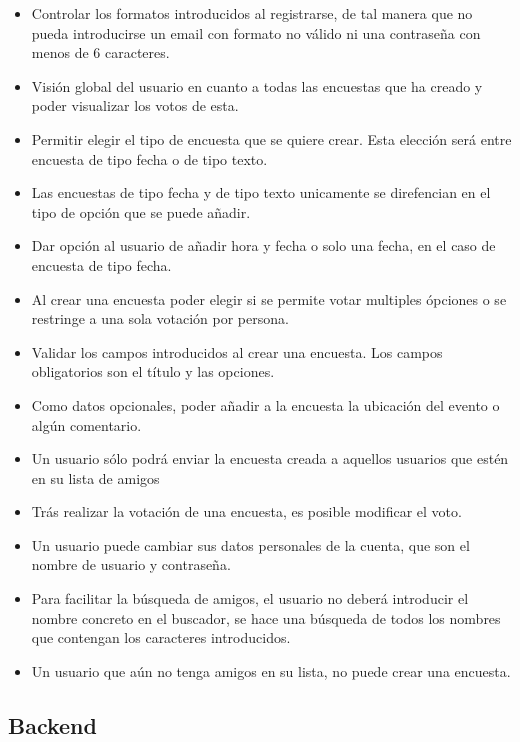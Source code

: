 \documentclass[a4paper, 12pt]{book}
\begin{document}
\begin{itemize}
 \item Controlar los formatos introducidos al registrarse, de tal manera que no pueda introducirse un email con formato no v\'alido ni una contrase\~na con menos de 6 caracteres.
 \item Visi\'on global del usuario en cuanto a todas las encuestas que ha creado y poder visualizar los votos de esta.
 \item Permitir elegir el tipo de encuesta que se quiere crear. Esta elecci\'on ser\'a entre encuesta de tipo fecha o de tipo texto.
 \item Las encuestas de tipo fecha y de tipo texto unicamente se direfencian en el tipo de opci\'on que se puede a\~nadir.
 \item Dar opci\'on al usuario de a\~nadir hora y fecha o solo una fecha, en el caso de encuesta de tipo fecha.
 \item Al crear una encuesta poder elegir si se permite votar multiples \'opciones o se restringe a una sola votaci\'on por persona.
 \item Validar los campos introducidos al crear una encuesta. Los campos obligatorios son el t\'itulo y las opciones.
 \item Como datos opcionales, poder a\~nadir a la encuesta la ubicaci\'on del evento o alg\'un comentario.
 \item Un usuario s\'olo podr\'a enviar la encuesta creada a aquellos usuarios que est\'en en su lista de amigos
 \item Tr\'as realizar la votaci\'on de una encuesta, es posible modificar el voto.
 \item Un usuario puede cambiar sus datos personales de la cuenta, que son el nombre de usuario y contrase\~na.
\item Para facilitar la b\'usqueda de amigos, el usuario no deber\'a introducir el nombre concreto en el buscador, se hace una b\'usqueda de todos los nombres que contengan los caracteres introducidos.
\item Un usuario que a\'un no tenga amigos en su lista, no puede crear una encuesta.
\end{itemize}

\subsection{Backend}
\label{sec:objetivos-especificos}
\end{document}
